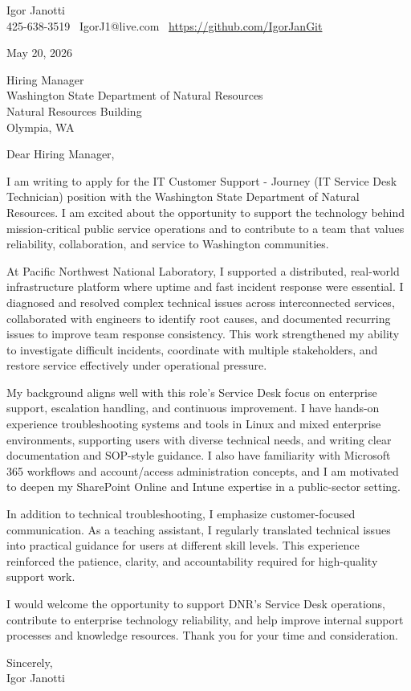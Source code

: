 \documentclass[11pt]{article}
\begin{document}
Igor Janotti\\
425-638-3519 \textbar\ IgorJ1@live.com \textbar\ \url{https://github.com/IgorJanGit}

May 20, 2026

Hiring Manager\\
Washington State Department of Natural Resources\\
Natural Resources Building\\
Olympia, WA

Dear Hiring Manager,

I am writing to apply for the IT Customer Support - Journey (IT Service Desk Technician) position with the Washington State Department of Natural Resources. I am excited about the opportunity to support the technology behind mission-critical public service operations and to contribute to a team that values reliability, collaboration, and service to Washington communities.

At Pacific Northwest National Laboratory, I supported a distributed, real-world infrastructure platform where uptime and fast incident response were essential. I diagnosed and resolved complex technical issues across interconnected services, collaborated with engineers to identify root causes, and documented recurring issues to improve team response consistency. This work strengthened my ability to investigate difficult incidents, coordinate with multiple stakeholders, and restore service effectively under operational pressure.

My background aligns well with this role's Service Desk focus on enterprise support, escalation handling, and continuous improvement. I have hands-on experience troubleshooting systems and tools in Linux and mixed enterprise environments, supporting users with diverse technical needs, and writing clear documentation and SOP-style guidance. I also have familiarity with Microsoft 365 workflows and account/access administration concepts, and I am motivated to deepen my SharePoint Online and Intune expertise in a public-sector setting.

In addition to technical troubleshooting, I emphasize customer-focused communication. As a teaching assistant, I regularly translated technical issues into practical guidance for users at different skill levels. This experience reinforced the patience, clarity, and accountability required for high-quality support work.

I would welcome the opportunity to support DNR's Service Desk operations, contribute to enterprise technology reliability, and help improve internal support processes and knowledge resources. Thank you for your time and consideration.

Sincerely,\\
Igor Janotti
\end{document}
